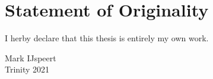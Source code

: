 \documentclass[../Thesis-IJspeert.tex]{subfiles}
\begin{document}
{
\cleardoublepage
\chapter*{Statement of Originality}
\thispagestyle{empty}

I herby declare that this thesis is entirely my own work.
}{
\flushright
Mark IJspeert\\
Trinity 2021
\vfill
}
\end{document}
